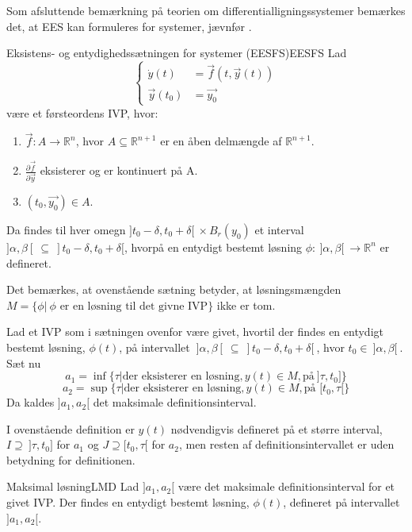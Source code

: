 Som afsluttende bemærkning på teorien om differentialligningssystemer bemærkes det, at EES kan formuleres for systemer, jævnfør \citep[s. 144]{Hirsch}.\\

\begin{mytheo}{Eksistens- og entydighedssætningen for systemer (EESFS)}{EESFS}
Lad 
\begin{equation*}
    \begin{cases}
      \dot{y}(t)&=\vec{f}(t,\vec{y}(t))\\
      \vec{y}(t_0)&=\vec{y_0}
    \end{cases}
\end{equation*}
være et førsteordens IVP, hvor: 

\begin{enumerate}
    \item $\vec{f}\colon A \to   \mathbb{R}^n$, hvor $A\subseteq\mathbb{R}^{n+1}$ er en åben delmængde af $\mathbb{R}^{n+1}$.
    \item $\frac{\partial\vec{f}}{\partial \vec{y}}$ eksisterer og er kontinuert på A.
    \item $(t_0,\vec{y_0}) \in A$.
\end{enumerate}

Da findes til hver omegn $]t_0-\delta,t_0+\delta[ \ \times B_r(y_0)$ et interval $]\alpha,\beta[ \ \subseteq \ ]t_0-\delta,t_0+\delta[$, hvorpå en entydigt bestemt løsning $\phi\colon \ ]\alpha,\beta[ \ \to \mathbb{R}^n$ er defineret.
\end{mytheo}
Det bemærkes, at ovenstående sætning betyder, at løsningsmængden\\
$M=\{\phi| \ \phi \text{ er en løsning til det givne IVP}\}$ ikke er tom.
\begin{definition}
Lad et IVP som i sætningen ovenfor være givet, hvortil der findes en entydigt bestemt løsning, $\phi(t)$, på intervallet $\ ]\alpha,\beta [\ \subseteq \ ]t_0-\delta,t_0+\delta[\ $, hvor $t_0\in \ ]\alpha,\beta[\ $.\\
Sæt nu $$a_1=\inf\{\tau|\text{der eksisterer en løsning}, y(t)\in M, \text{på} \ ]\tau , t_0] \}$$
$$a_2=\sup\{\tau|\text{der eksisterer en løsning}, y(t)\in M, \text{på } [t_0 , \tau[ \}$$
Da kaldes $]a_1,a_2[$ det maksimale definitionsinterval.
\end{definition}
I ovenstående definition er $y(t)$ nødvendigvis defineret på et større interval, $I\supseteq\ ]\tau , t_0]$ for $a_1$ og $J\supseteq [t_0 , \tau[$ for $a_2$, men resten af definitionsintervallet er uden betydning for definitionen.
\begin{lemma}{Maksimal løsning}{LMD}
Lad $]a_1,a_2[$ være det maksimale definitionsinterval for et givet IVP. Der findes en entydigt bestemt løsning, $\phi(t)$, defineret på intervallet $]a_1,a_2[$.
\end{lemma}

